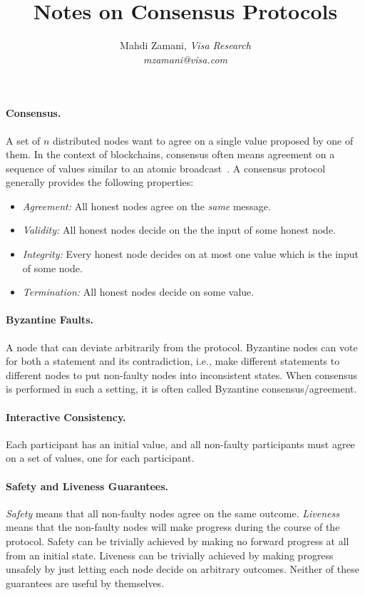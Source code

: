 \documentclass[11pt]{article}
\theoremstyle{mytheoremstyle}
\begin{document}
\title{Notes on Consensus Protocols}

\author{Mahdi Zamani, \textit{Visa Research} \\ \textit{mzamani@visa.com}}
\date{}

\maketitle

\paragraph{Consensus.}
A set of $n$ distributed nodes want to agree on a single value proposed by one of them. In the context of blockchains, consensus often means agreement on a sequence of values similar to an atomic broadcast~\cite{DBLP:journals/corr/CachinV17}. A consensus protocol generally provides the following properties:

\begin{itemize}
	\item \textit{Agreement:} All honest nodes agree on the \emph{same} message.
	\item \textit{Validity:} All honest nodes decide on the the input of some honest node.
	\item \textit{Integrity:} Every honest node decides on at most one value which is the input of some node.
	\item \textit{Termination:} All honest nodes decide on some value.
\end{itemize}

\paragraph{Byzantine Faults.} A node that can deviate arbitrarily from the protocol. Byzantine nodes can vote for both a statement and its contradiction, i.e., make different statements to different nodes to put non-faulty nodes into inconsistent states. When consensus is performed in such a setting, it is often called Byzantine consensus/agreement.

\paragraph{Interactive Consistency.} Each participant has an initial value, and all non-faulty participants must agree on a set of values, one for each participant.

\paragraph{Safety and Liveness Guarantees.} \emph{Safety} means that all non-faulty nodes agree on the same outcome. \emph{Liveness} means that the non-faulty nodes will make progress during the course of the protocol. Safety can be trivially achieved by making no forward progress at all from an initial state. Liveness can be trivially achieved by making progress unsafely by just letting each node decide on arbitrary outcomes. Neither of these guarantees are useful by themselves.
\end{document}
